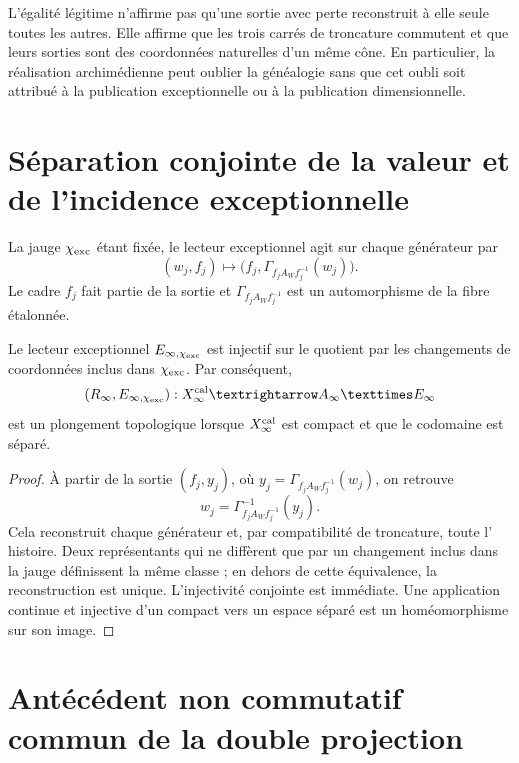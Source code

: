 L'égalité légitime n'affirme pas qu'une sortie avec perte reconstruit à elle
seule toutes les autres. Elle affirme que les trois carrés de troncature commutent et
que leurs sorties sont des coordonnées naturelles d'un même cône. En particulier,
la réalisation archimédienne peut oublier la généalogie sans que cet oubli soit
attribué à la publication exceptionnelle ou à la publication dimensionnelle.

\section{Séparation conjointe de la valeur et de l'incidence exceptionnelle}
\label{sec:cpe-separacion-conjunta}

La jauge \(\chi_{\rm exc}\) étant fixée, le lecteur exceptionnel agit sur chaque
générateur par
\begin{equation}
 (w_j,f_j)\longmapsto
 \bigl(f_j,\Gamma_{f_jA_Wf_j^{-1}}(w_j)\bigr).
 \label{eq:cpe-lector-excepcional-generador}
\end{equation}
Le cadre \(f_j\) fait partie de la sortie et
\(\Gamma_{f_jA_Wf_j^{-1}}\) est un automorphisme de la fibre étalonnée.

\begin{theorem}
\label{thm:cpe-separacion-calibrada}
Le lecteur exceptionnel
\(\mathfrak E_{\infty,\chi_{\rm exc}}\) est injectif sur le quotient par
les changements de coordonnées inclus dans \(\chi_{\rm exc}\). Par conséquent,
\[
 (\mathfrak R_\infty,\mathfrak E_{\infty,\chi_{\rm exc}})
 :X_\infty^{\rm cal}\longrightarrow
 A_\infty\times E_\infty
\]
est un plongement topologique lorsque \(X_\infty^{\rm cal}\) est compact et que le
codomaine est séparé.
\end{theorem}

\begin{proof}
À partir de la sortie \((f_j,y_j)\), où
\(y_j=\Gamma_{f_jA_Wf_j^{-1}}(w_j)\), on retrouve
\[
 w_j=\Gamma_{f_jA_Wf_j^{-1}}^{-1}(y_j).
\]
Cela reconstruit chaque générateur et, par compatibilité de troncature, toute l'
histoire. Deux représentants qui ne diffèrent que par un changement inclus dans la
jauge définissent la même classe ; en dehors de cette équivalence, la reconstruction
est unique. L'injectivité conjointe est immédiate. Une application continue et
injective d'un compact vers un espace séparé est un homéomorphisme sur son image.
\end{proof}

\section{Antécédent non commutatif commun de la double projection}
\label{sec:cpe-antecedente-ucp}

